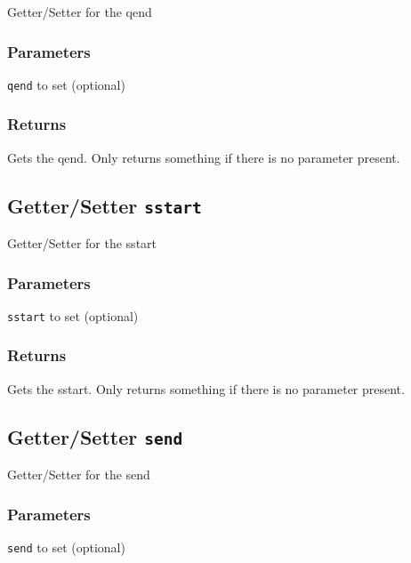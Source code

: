 Getter/Setter for the qend

\subsubsection*{Parameters\label{Parameters}}
\begin{description}

\item[{\texttt{qend} to set (optional)}] \mbox{}\end{description}
\subsubsection*{Returns\label{Returns}}


Gets the qend. Only returns something if there is no parameter present.

\subsection*{Getter/Setter \texttt{sstart}\label{Getter_Setter_sstart}}


Getter/Setter for the sstart

\subsubsection*{Parameters\label{Parameters}}
\begin{description}

\item[{\texttt{sstart} to set (optional)}] \mbox{}\end{description}
\subsubsection*{Returns\label{Returns}}


Gets the sstart. Only returns something if there is no parameter present.

\subsection*{Getter/Setter \texttt{send}\label{Getter_Setter_send}}


Getter/Setter for the send

\subsubsection*{Parameters\label{Parameters}}
\begin{description}

\item[{\texttt{send} to set (optional)}] \mbox{}\end{description}
